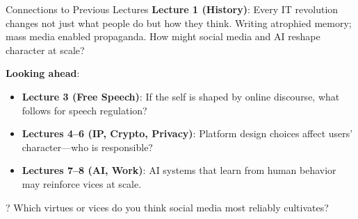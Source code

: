 \documentclass[aspectratio=169]{beamer}
\begin{document}
\begin{frame}{Connections to Previous Lectures}
\textbf{Lecture 1 (History)}: Every IT revolution changes not just what people do but how they think. Writing atrophied memory; mass media enabled propaganda. How might social media and AI reshape character at scale?

\vspace{0.2cm}
\textbf{Looking ahead}:
\begin{itemize}
    \item \textbf{Lecture 3 (Free Speech)}: If the self is shaped by online discourse, what follows for speech regulation?
    \item \textbf{Lectures 4--6 (IP, Crypto, Privacy)}: Platform design choices affect users' character---who is responsible?
    \item \textbf{Lectures 7--8 (AI, Work)}: AI systems that learn from human behavior may reinforce vices at scale.
\end{itemize}

\begin{alertblock}{?}
Which virtues or vices do you think social media most reliably cultivates?
\end{alertblock}
\end{frame}
\end{document}
